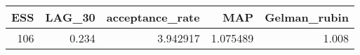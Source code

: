 \begin{longtable}{rrrrr}
\toprule
ESS & LAG\_30 & acceptance\_rate & MAP & Gelman\_rubin \\ 
\midrule
106 & 0.234 & 3.942917 & 1.075489 & 1.008 \\ 
\bottomrule
\end{longtable}

